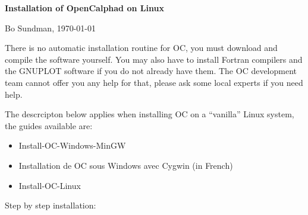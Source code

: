 \documentclass[12pt]{article}
\begin{document}
\begin{center}
{\Large \bf Installation of OpenCalphad on Linux}

Bo Sundman, \today

\end{center}

There is no automatic installation routine for OC, you must download
and compile the software yourself.  You may also have to install
Fortran compilers and the GNUPLOT software if you do not already have
them.  The OC development team cannot offer you any help for that,
please ask some local experts if you need help.

The descrcipton below applies when installing OC on a ``vanilla''
Linux system, the guides available are:
\begin{itemize}
\item Install-OC-Windows-MinGW
\item Installation de OC sous Windows avec Cygwin (in French)
\item Install-OC-Linux
\end{itemize}

Step by step installation:
\end{document}
